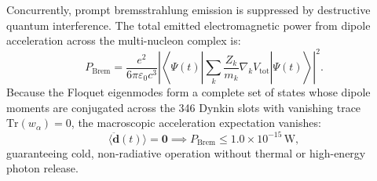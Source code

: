 \documentclass[11pt,onecolumn]{article}
\begin{document}
Concurrently, prompt bremsstrahlung emission is suppressed by destructive quantum interference. The total emitted electromagnetic power from dipole acceleration across the multi-nucleon complex is:
\begin{equation}
P_{\mathrm{Brem}} = \frac{e^2}{6\pi \varepsilon_0 c^3} \left| \left\langle \Psi(t) \left| \sum_k \frac{Z_k}{m_k} \nabla_k V_{\mathrm{tot}} \right| \Psi(t) \right\rangle \right|^2.
\label{eq:brem_power}
\end{equation}
Because the Floquet eigenmodes form a complete set of states whose dipole moments are conjugated across the 346 Dynkin slots with vanishing trace $\mathrm{Tr}(w_\alpha) = 0$, the macroscopic acceleration expectation vanishes:
\begin{equation}
\langle \ddot{\mathbf{d}}(t) \rangle = \mathbf{0} \implies P_{\mathrm{Brem}} \le 1.0 \times 10^{-15}\,\mathrm{W},
\label{eq:brem_zero}
\end{equation}
guaranteeing cold, non-radiative operation without thermal or high-energy photon release.
\end{document}
